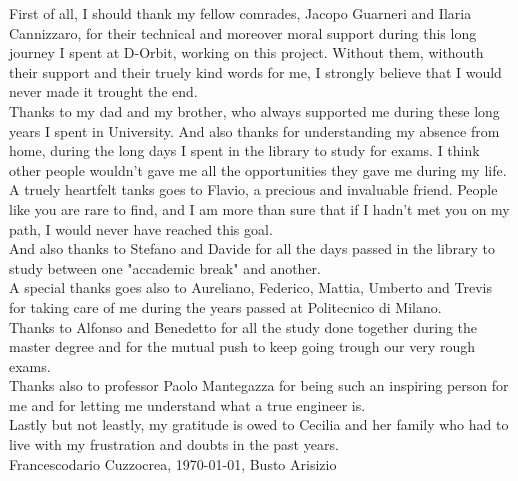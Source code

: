 First of all, I should thank my fellow comrades, Jacopo Guarneri and Ilaria Cannizzaro, for their technical and moreover moral support during this long journey I spent at D-Orbit, working on this project. Without them, withouth their support and their truely kind words for me, I strongly believe that I would never made it trought the end.\\
Thanks to my dad and my brother, who always supported me during these long years I spent in University. And also thanks for understanding my absence from home, during the long days I spent in the library to study for exams. I think other people wouldn't gave me all the opportunities they gave me during my life.\\
A truely heartfelt tanks goes to Flavio, a precious and invaluable friend. People like you are rare to find, and I am more than sure that if I hadn't met you on my path, I would never have reached this goal.\\
And also thanks to Stefano and Davide for all the days passed in the library to study between one "accademic break" and another.\\
A special thanks goes also to Aureliano, Federico, Mattia, Umberto and Trevis for taking care of me during the years passed at Politecnico di Milano.\\
Thanks to Alfonso and Benedetto for all the study done together during the master degree and for the mutual push to keep going trough our very rough exams.\\
Thanks also to professor Paolo Mantegazza for being such an inspiring person for me and for letting me understand what a true engineer is.\\
Lastly but not leastly, my gratitude is owed to Cecilia and her family who had to live with my frustration and doubts in the past years.\\

Francescodario Cuzzocrea, \today, Busto Arisizio
